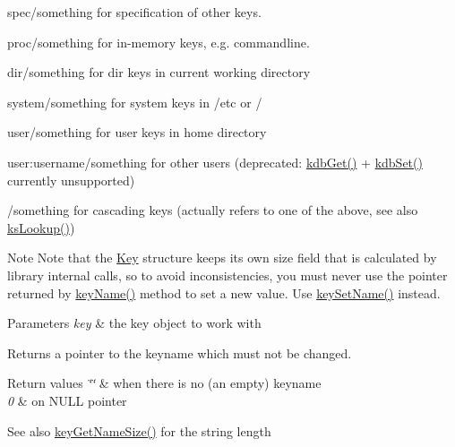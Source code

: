 \begin{DoxyItemize}
\item {\ttfamily spec/something} for specification of other keys.
\item {\ttfamily proc/something} for in-\/memory keys, e.\+g. commandline.
\item {\ttfamily dir/something} for dir keys in current working directory
\item {\ttfamily system/something} for system keys in /etc or /
\item {\ttfamily user/something} for user keys in home directory
\item {\ttfamily user\+:username/something} for other users (deprecated\+: \mbox{\hyperlink{group__kdb_ga28e385fd9cb7ccfe0b2f1ed2f62453a1}{kdb\+Get()}} + \mbox{\hyperlink{group__kdb_ga11436b058408f83d303ca5e996832bcf}{kdb\+Set()}} currently unsupported)
\item {\ttfamily /something} for cascading keys (actually refers to one of the above, see also \mbox{\hyperlink{group__keyset_gaa34fc43a081e6b01e4120daa6c112004}{ks\+Lookup()}})

\begin{DoxyNote}{Note}
Note that the \mbox{\hyperlink{classkdb_1_1Key}{Key}} structure keeps its own size field that is calculated by library internal calls, so to avoid inconsistencies, you must never use the pointer returned by \mbox{\hyperlink{group__keyname_ga8e805c726a60da921d3736cda7813513}{key\+Name()}} method to set a new value. Use \mbox{\hyperlink{group__keyname_ga7699091610e7f3f43d2949514a4b35d9}{key\+Set\+Name()}} instead.
\end{DoxyNote}

\begin{DoxyParams}{Parameters}
{\em key} & the key object to work with \\
\hline
\end{DoxyParams}
\begin{DoxyReturn}{Returns}
a pointer to the keyname which must not be changed. 
\end{DoxyReturn}

\begin{DoxyRetVals}{Return values}
{\em \char`\"{}\char`\"{}} & when there is no (an empty) keyname \\
\hline
{\em 0} & on N\+U\+LL pointer \\
\hline
\end{DoxyRetVals}
\begin{DoxySeeAlso}{See also}
\mbox{\hyperlink{group__keyname_gabdbcfa51ed8a387e47ead207affa2d2e}{key\+Get\+Name\+Size()}} for the string length 


\end{DoxySeeAlso}
\end{DoxyItemize}
